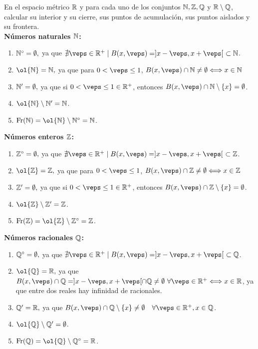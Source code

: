 \begin{ejercicio}
    En el espacio métrico $\mathbb{R}$ y para cada uno de los conjuntos $\mathbb{N}, \mathbb{Z}, \mathbb{Q}$ y $\mathbb{R}\setminus \mathbb{Q}$, calcular su interior y su cierre, sus puntos de acumulación, sus puntos aislados y su frontera.\\

    \textbf{Números naturales $\mathbb{N}$:}
    \begin{enumerate}
        \item $\mathbb{N}^\circ = \emptyset,$ ya que $\nexists \veps\in \bb{R}^+\mid B(x,\veps)=]x-\veps, x+\veps[~\subset \bb{N}$.
        \item $\ol{\bb{N}} = \bb{N},$ ya que para $0<\veps\leq 1$, $B(x,\veps)\cap \bb{N}\neq \emptyset \Longleftrightarrow x\in \bb{N}$
        \item ${\mathbb{N}}' = \emptyset,$ ya que si $0<\veps\leq 1\in \bb{R}^+$, entonces $B(x,\veps)\cap \bb{N}\setminus\{x\} = \emptyset$.
        \item $\ol{\bb{N}}\setminus {\bb{N}}' =\bb{N}$.
        \item $\Fr(\bb{N})=\ol{\bb{N}}\setminus \bb{N}^\circ=\bb{N}$.
    \end{enumerate}

    \textbf{Números enteros $\mathbb{Z}$:}
    \begin{enumerate}
        \item $\mathbb{Z}^\circ = \emptyset,$ ya que $\nexists \veps\in \bb{R}^+\mid B(x,\veps)=]x-\veps, x+\veps[~\subset \bb{Z}$.
        \item $\ol{\bb{Z}} = \bb{Z},$ ya que para $0<\veps\leq 1$, $B(x,\veps)\cap \bb{Z}\neq \emptyset \Longleftrightarrow x\in \bb{Z}$
        \item ${\mathbb{Z}}' = \emptyset,$ ya que si $0<\veps\leq 1\in \bb{R}^+$, entonces $B(x,\veps)\cap \bb{Z}\setminus\{x\} = \emptyset$.
        \item $\ol{\bb{Z}}\setminus {\bb{Z}}' =\bb{Z}$.
        \item $\Fr(\bb{Z})=\ol{\bb{Z}}\setminus \bb{Z}^\circ=\bb{Z}$.
    \end{enumerate}

    \textbf{Números racionales $\mathbb{Q}$:}
    \begin{enumerate}
        \item $\mathbb{Q}^\circ = \emptyset,$ ya que $\nexists \veps\in \bb{R}^+\mid B(x,\veps)=]x-\veps, x+\veps[~\subset \bb{Q}$.
        \item $\ol{\bb{Q}} = \bb{R},$ ya que $B(x,\veps)\cap \bb{Q} = ]x-\veps, x+\veps[\cap \bb{Q}\neq \emptyset ~\forall \veps\in \bb{R}^+ \Longleftrightarrow x\in \bb{R}$, ya que entre dos reales hay infinidad de racionales.
        \item ${\mathbb{Q}}' = \mathbb{R},$ ya que $B(x,\veps)\cap \bb{Q}\setminus\{x\} \neq \emptyset \quad \forall \veps\in \bb{R}^+, x\in \bb{Q}$.
        \item $\ol{\bb{Q}}\setminus {\bb{Q}}' =\emptyset$.
        \item $\Fr(\bb{Q})=\ol{\bb{Q}}\setminus \bb{Q}^\circ=\bb{R}$.
    \end{enumerate}


\end{ejercicio}
